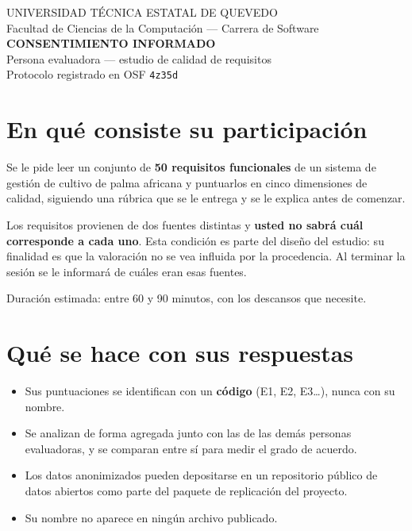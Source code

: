 \documentclass[11pt,a4paper]{article}
\begin{document}
\begin{center}
{\footnotesize UNIVERSIDAD TÉCNICA ESTATAL DE QUEVEDO\\
Facultad de Ciencias de la Computación --- Carrera de Software}\\[8pt]
{\large\bfseries\color{uteqverde} CONSENTIMIENTO INFORMADO}\\[2pt]
{\normalsize Persona evaluadora --- estudio de calidad de requisitos}\\[2pt]
{\footnotesize Protocolo registrado en OSF \texttt{4z35d}}
\end{center}

\vspace{2pt}

\section{En qué consiste su participación}

Se le pide leer un conjunto de \textbf{50 requisitos funcionales} de un sistema
de gestión de cultivo de palma africana y puntuarlos en cinco dimensiones de
calidad, siguiendo una rúbrica que se le entrega y se le explica antes de
comenzar.

Los requisitos provienen de dos fuentes distintas y \textbf{usted no sabrá cuál
corresponde a cada uno}. Esta condición es parte del diseño del estudio: su
finalidad es que la valoración no se vea influida por la procedencia. Al
terminar la sesión se le informará de cuáles eran esas fuentes.

Duración estimada: entre 60 y 90 minutos, con los descansos que necesite.

\section{Qué se hace con sus respuestas}

\begin{itemize}[nosep,leftmargin=1.5em]
  \item Sus puntuaciones se identifican con un \textbf{código} (E1, E2, E3\dots),
        nunca con su nombre.
  \item Se analizan de forma agregada junto con las de las demás personas
        evaluadoras, y se comparan entre sí para medir el grado de acuerdo.
  \item Los datos anonimizados pueden depositarse en un repositorio público de
        datos abiertos como parte del paquete de replicación del proyecto.
  \item Su nombre no aparece en ningún archivo publicado.
\end{itemize}
\end{document}
